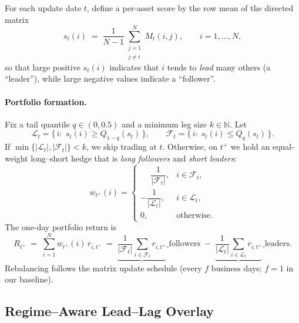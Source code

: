 For each update date $t$, define a per-asset score by the row mean of the directed matrix
\[
s_t(i)\;=\;\frac{1}{N-1}\sum_{\substack{j=1\\ j\neq i}}^{N} M_t(i,j),\qquad i=1,\dots,N,
\]
so that large positive $s_t(i)$ indicates that $i$ tends to \emph{lead} many others (a ``leader''), while large negative values indicate a ``follower''.

\paragraph{Portfolio formation.}
Fix a tail quantile $q\in(0,0.5)$ and a minimum leg size $k\in\mathbb{N}$.
Let
\[
\mathcal{L}_t=\{\,i:\; s_t(i)\ge Q_{1-q}(s_t)\,\},\qquad
\mathcal{F}_t=\{\,i:\; s_t(i)\le Q_{q}(s_t)\,\}.
\]
If $\min\{|\mathcal{L}_t|,|\mathcal{F}_t|\}<k$, we skip trading at $t$.
Otherwise, on $t^+$ we hold an equal-weight long--short hedge that is \emph{long followers} and \emph{short leaders}:
\[
w_{t^+}(i)=
\begin{cases}
\phantom{-}\dfrac{1}{|\mathcal{F}_t|}, & i\in\mathcal{F}_t,\\[6pt]
-\dfrac{1}{|\mathcal{L}_t|}, & i\in\mathcal{L}_t,\\[6pt]
0, & \text{otherwise}.
\end{cases}
\]
The one-day portfolio return is
\[
R_{t^+}\;=\;\sum_{i=1}^N w_{t^+}(i)\,r_{i,t^+}
\;=\;\underbrace{\frac{1}{|\mathcal{F}_t|}\sum_{i\in\mathcal{F}_t} r_{i,t^+}}\_{\text{followers}}
\;-\;\underbrace{\frac{1}{|\mathcal{L}_t|}\sum_{i\in\mathcal{L}_t} r_{i,t^+}}\_{\text{leaders}}.
\]
Rebalancing follows the matrix update schedule (every $f$ business days; $f=1$ in our baseline).

\subsection{Regime–Aware Lead--Lag Overlay}\label{sec:regime}

